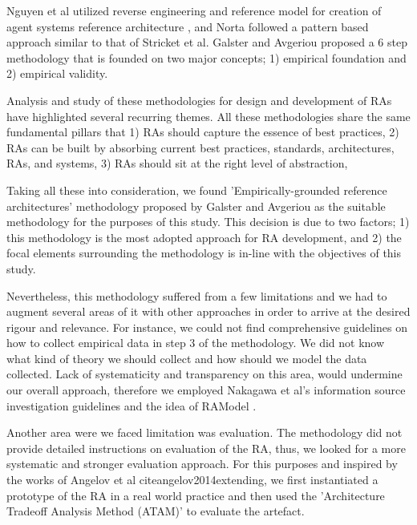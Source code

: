 \documentclass[runningheads]{llncs}
\begin{document}
Nguyen et al utilized reverse engineering and reference model for creation of agent systems reference architecture \cite{nguyen2010methodology}, and Norta \cite{norta2006developing} followed a pattern based approach similar to that of Stricket et al. Galster and Avgeriou \cite{GALSTER} proposed a 6 step methodology that is founded on two major concepts; 1) empirical foundation and 2) empirical validity.

Analysis and study of these methodologies for design and development of RAs have highlighted several recurring themes.
All these methodologies share the same fundamental pillars that 1) RAs should capture the essence of best practices, 2) RAs can be built by absorbing current best practices, standards, architectures, RAs, and systems, 3) RAs should sit at the right level of abstraction,

Taking all these into consideration, we found 'Empirically-grounded reference architectures' methodology proposed by Galster and Avgeriou as the suitable methodology for the purposes of this study. This decision is due to two factors; 1) this methodology is the most adopted approach for RA development, and 2) the focal elements surrounding the methodology is in-line with the objectives of this study. 

Nevertheless, this methodology suffered from a few limitations and we had to augment several areas of it with other approaches in order to arrive at the desired rigour and relevance. For instance, we could not find comprehensive guidelines on how to collect empirical data in step 3 of the methodology. We did not know what kind of theory we should collect and how should we model the data collected. Lack of systematicity and transparency on this area, would undermine our overall approach, therefore we employed Nakagawa et al's information source investigation guidelines and the idea of RAModel \cite{nakagawa2012ramodel}. 

Another area were we faced limitation was evaluation. The methodology did not provide detailed instructions on evaluation of the RA, thus, we looked for a more systematic and stronger evaluation approach. For this purposes and inspired by the works of Angelov et al \cite{angelov2008towards} cite{angelov2014extending}, we first instantiated a prototype of the RA in a real world practice and then used the 'Architecture Tradeoff Analysis Method (ATAM)'\cite{KazmanATAM} to evaluate the artefact.
\end{document}
